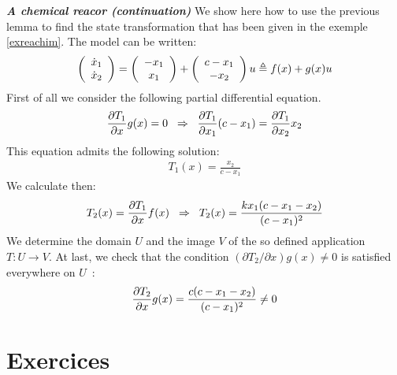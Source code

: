 \begin{exemple}{\bf \em A chemical reacor (continuation) }
We show here how to use the previous lemma to find the state transformation that has been given in the exemple
 \ref{exreachim}. The model can be written:
\begin{equation*} \begin{split}
\bma{c} \dot x_1 \\ \dot x_2 \ema = \bma{c} -x_1 \\ x_1 \ema + \bma{c} c-x_1 \\ -x_2 \ema u \triangleq f(x) + g(x)u
\end{split} \end{equation*}
First of all we consider the following partial differential equation.
\begin{equation*} \begin{split}
\frac{\partial T_1}{\partial x}g(x)=0 \hh \Rightarrow \hh \frac{\partial T_1}{\partial x_1}(c-x_1) = \frac{\partial T_1}{\partial x_2}x_2
\end{split} \end{equation*}
This equation admits the following solution:
\begin{equation*} \begin{split}
T_1(x) = \frac{x_2}{c-x_1}
\end{split} \end{equation*}
We calculate then:
\begin{equation*} \begin{split}
T_2(x) = \frac{\partial T_1}{\partial x}f(x) \hh \Rightarrow \hh T_2(x) = \frac{kx_1(c-x_1-x_2)}{(c-x_1)^2}
\end{split} \end{equation*}
We determine the domain  $U$ and the image $V$ of the so defined application $T:U \rightarrow V$. At last, we check that the condition $(\partial T_2/\partial x)g(x) \neq 0$ is satisfied everywhere on $U$~:
\begin{equation*} \begin{split}
\frac{\partial T_2}{\partial x}g(x) = \frac{c(c-x_1-x_2)}{(c-x_1)^2} \neq 0 \xqedhere{3.9cm}{\qed}
\end{split} \end{equation*}
\end{exemple}

\section{Exercices}

